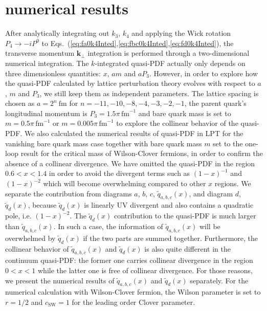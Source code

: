 \documentclass[english,preprint,aps,prd,showpacs,superscriptaddress,nofootinbib,tightenlines]{revtex4}
\begin{document}
\section{numerical results }\label{sctn:nmrc_rslt}

{After analytically integrating out $k_{3}$, $k_{4}$ and applying the Wick rotation $P_4\rightarrow-iP^0$} to Eqs.~(\ref{eq:fa0k4Inted},\ref{eq:fbc0k4Inted},\ref{eq:fd0k4Inted}), the transverse
momentum $\boldsymbol{k}_{\perp}$ integration is performed through
a two-dimensional numerical integration. The $k$-integrated quasi-PDF
actually only depends on three dimensionless quantities:
$x$, $am$ and $aP_{3}$. However, in order to explore how the quasi-PDF calculated by lattice
perturbation theory evolves with respect to $a$, $m$ and $P_{3}$,
we still keep them as independent parameters. The lattice spacing
is chosen as $a=2^{n}~\mathrm{fm}$ for $n=-11,-10,-8,-4,-3,-2,-1$, the parent quark's longitudinal momentum is $P_{3}=1.5\pi\,\text{fm}^{-1}$ and
bare quark mass is set to $m=0.5\pi\,\text{fm}^{-1}$ or $m=0.005\pi\,\text{fm}^{-1}$ to explore the
collinear behavior of the quasi-PDF. We also calculated the numerical
results of quasi-PDF in LPT for the vanishing bare quark mass case {together with  
bare quark mass $m$ set to the one-loop result for the critical mass of Wilson-Clover fermions,} in order to confirm the absence of a collinear divergence. We have omitted the quasi-PDF in the region $0.6<x<1.4$ in order
to avoid the divergent terms such as $(1-x)^{-1}$ and $(1-x)^{-2}$
which will become overwhelming compared to other $x$ regions. We
separate the contribution from diagrams $a$, $b$, $c$, $\tilde{q}_{a,b,c}\left(x\right)$,
and diagram $d$, $\tilde{q}_{d}\left(x\right)$, because $\tilde{q}_{d}\left(x\right)$
is linearly UV divergent and also contains a quadratic pole,
i.e. $\left(1-x\right)^{-2}$. The $\tilde{q}_{d}\left(x\right)$ contribution
to the quasi-PDF is much larger than $\tilde{q}_{a,b,c}\left(x\right)$.
In such a case, the information of $\tilde{q}_{a,b,c}\left(x\right)$
will be overwhelmed by $\tilde{q}_{d}\left(x\right)$ if the two parts
are summed together. Furthermore, the collinear behavior of $\tilde{q}_{a,b,c}\left(x\right)$
and $\tilde{q}_{d}\left(x\right)$ is also quite different in the
continuum quasi-PDF: the former one carries collinear divergence in
the region $0<x<1$ while the latter one is free of collinear divergence.
For those reasons, we present the numerical results of $\tilde{q}_{a,b,c}\left(x\right)$
and $\tilde{q}_{d}\left(x\right)$ separately. For the numerical calculation with Wilson-Clover fermion, the Wilson parameter
is set to $r=1/2$ and $c_{\mathrm{SW}}=1$ for the leading order Clover parameter.
\end{document}
